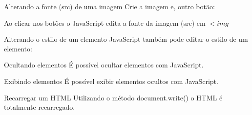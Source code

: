 \documentclass{beamer}
\begin{document}
\begin{frame}{Alterando a fonte (src) de uma imagem}
Crie a imagem e, outro botão:
 \begin{center}
	
 \end{center}
\pause Ao clicar nos botões o JavaScript edita a fonte da imagem (src) em $<img$
\end{frame}
\begin{frame}{Alterando o estilo de um elemento}
JavaScript também pode editar o estilo de um elemento:
	\begin{center}
			

		\end{center}
\end{frame}
\begin{frame}{Ocultando elementos}
É possível ocultar elementos com JavaScript.
	\begin{center}
		

	\end{center}
\end{frame}
\begin{frame}{Exibindo elementos}
É possível exibir elementos ocultos com JavaScript.
	\begin{center}
		

	\end{center}
\end{frame}
\begin{frame}{Recarregar um HTML}
Utilizando o método document.write() o HTML é totalmente recarregado.
	\begin{center}
		

	\end{center}
\end{frame}

\end{document}
